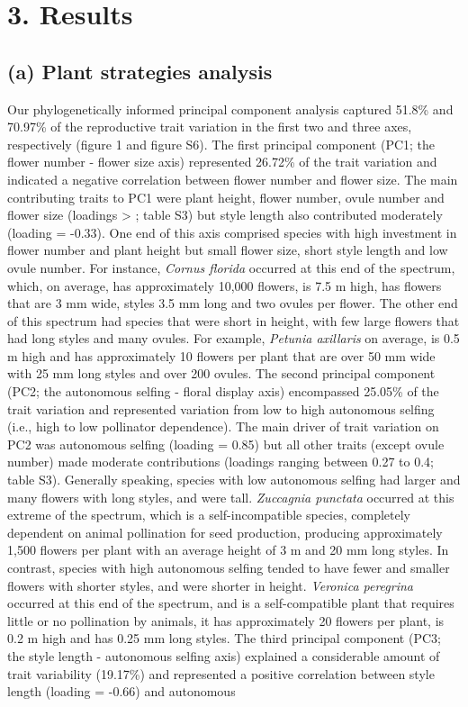 \documentclass[
  12pt,
  a4paper,
]{article}
\begin{document}
\hypertarget{results}{%
\section{3. Results}\label{results}}

\hypertarget{a-plant-strategies-analysis}{%
\subsection{(a) Plant strategies analysis}\label{a-plant-strategies-analysis}}

Our phylogenetically informed principal component analysis captured 51.8\% and 70.97\% of the reproductive trait variation in the first two and three axes, respectively (figure 1 and figure S6). The first principal component (PC1; the flower number - flower size axis) represented 26.72\% of the trait variation and indicated a negative correlation between flower number and flower size. The main contributing traits to PC1 were plant height, flower number, ovule number and flower size (loadings \textgreater{} \textbar; table S3) but style length also contributed moderately (loading = -0.33). One end of this axis comprised species with high investment in flower number and plant height but small flower size, short style length and low ovule number. For instance, \emph{Cornus florida} occurred at this end of the spectrum, which, on average, has approximately 10,000 flowers, is 7.5 m high, has flowers that are 3 mm wide, styles 3.5 mm long and two ovules per flower. The other end of this spectrum had species that were short in height, with few large flowers that had long styles and many ovules. For example, \emph{Petunia axillaris} on average, is 0.5 m high and has approximately 10 flowers per plant that are over 50 mm wide with 25 mm long styles and over 200 ovules. The second principal component (PC2; the autonomous selfing - floral display axis) encompassed 25.05\% of the trait variation and represented variation from low to high autonomous selfing (i.e., high to low pollinator dependence). The main driver of trait variation on PC2 was autonomous selfing (loading = 0.85) but all other traits (except ovule number) made moderate contributions (loadings ranging between 0.27 to 0.4; table S3). Generally speaking, species with low autonomous selfing had larger and many flowers with long styles, and were tall. \emph{Zuccagnia punctata} occurred at this extreme of the spectrum, which is a self-incompatible species, completely dependent on animal pollination for seed production, producing approximately 1,500 flowers per plant with an average height of 3 m and 20 mm long styles. In contrast, species with high autonomous selfing tended to have fewer and smaller flowers with shorter styles, and were shorter in height. \emph{Veronica peregrina} occurred at this end of the spectrum, and is a self-compatible plant that requires little or no pollination by animals, it has approximately 20 flowers per plant, is 0.2 m high and has 0.25 mm long styles. The third principal component (PC3; the style length - autonomous selfing axis) explained a considerable amount of trait variability (19.17\%) and represented a positive correlation between style length (loading = -0.66) and autonomous 
\end{document}
